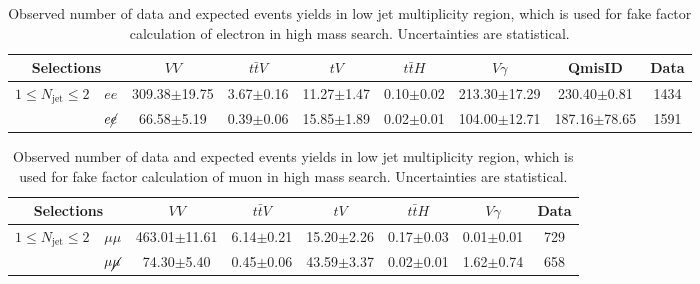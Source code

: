 \begin{table}[!ht]
\begin{center}
\small
\begin{tabular}{c|c|cccc|c|c|c}
\hline
\hline
\multicolumn{2}{c|}{ Selections}                      &$VV$  &$t\bar{t}V$    &$tV$    &$t\bar{t}H$     &$V\gamma$  &QmisID  &Data \\
\hline
\multirow{2}{*}{$1\leq N_{\text{jet}} \leq 2$}  &$ee$ &309.38$\pm$19.75    &3.67$\pm$0.16    &11.27$\pm$1.47    &0.10$\pm$0.02    &213.30$\pm$17.29    &230.40$\pm$0.81    &1434 \\
\cline{2-9}                                       &$e\cancel{e}$ &66.58$\pm$5.19    &0.39$\pm$0.06    &15.85$\pm$1.89    &0.02$\pm$0.01    &104.00$\pm$12.71    &187.16$\pm$78.65    &1591 \\
\hline
\hline
\end{tabular}
\caption{Observed number of data and expected events yields in low jet multiplicity region, which is used for fake factor calculation of electron in high mass search. Uncertainties are statistical.}
\end{center}
\end{table}

\begin{table}[!ht]
\begin{center}
\small
\begin{tabular}{c|c|cccc|c|c}
\hline
\hline
\multicolumn{2}{c|}{ Selections}                           &$VV$  &$t\bar{t}V$    &$tV$    &$t\bar{t}H$     &$V\gamma$    &Data \\
\hline
\multirow{2}{*}{$1\leq N_{\text{jet}} \leq 2$}   &$\mu\mu$ &463.01$\pm$11.61    &6.14$\pm$0.21    &15.20$\pm$2.26    &0.17$\pm$0.03    &0.01$\pm$0.01    &729 \\
\cline{2-8}
                                        &$\mu\cancel{\mu}$ &74.30$\pm$5.40    &0.45$\pm$0.06    &43.59$\pm$3.37    &0.02$\pm$0.01    &1.62$\pm$0.74    &658 \\
\hline
\hline
\end{tabular}
\caption{Observed number of data and expected events yields in low jet multiplicity region, which is used for fake factor calculation of muon in high mass search. Uncertainties are statistical.}
\end{center}
\end{table}
